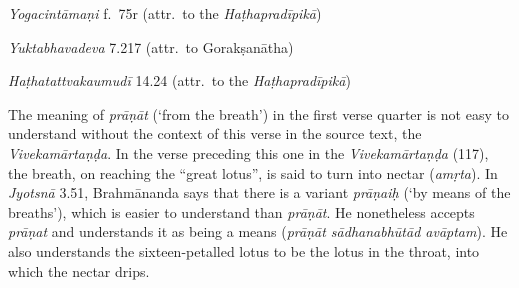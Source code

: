 \begin{ekdosis}
\begin{testimonia}[hp03_047]
\emph{Yogacintāmaṇi} f.~75r (attr.~to the \emph{Haṭhapradīpikā})
\begin{versinnote}
\end{versinnote}

\emph{Yuktabhavadeva} 7.217 (attr.~to Gorakṣanātha)
\begin{versinnote}
\tl{\var{cintayet ] cintayan \vl}\\!}
\end{versinnote}

\emph{Haṭhatattvakaumudī} 14.24 (attr.~to the \emph{Haṭhapradīpikā})
\begin{versinnote}
\tl{\var{ūrdhvaṃ ] mūrdhvaṃ \vl}\\!}
\end{versinnote}
\end{testimonia}

\begin{philcomm}[hp03_047]
The meaning of \emph{prāṇāt} (`from the breath') in the first verse quarter is not easy to understand without the context of this verse in the source text, the \emph{Vivekamārtaṇḍa}. In the verse preceding this one in the \emph{Vivekamārtaṇḍa} (117), the breath, on reaching the “great lotus”, is said to turn into nectar (\emph{amṛta}). In \emph{Jyotsnā} 3.51, Brahmānanda says that there is a variant \emph{prāṇaiḥ} (`by means of the breaths'), which is easier to understand than \emph{prāṇāt}. He nonetheless accepts \emph{prāṇat} and understands it as being a means (\emph{prāṇāt sādhanabhūtād avāptam}). He also understands the sixteen-petalled lotus to be the lotus in the throat, into which the nectar drips.
\end{philcomm}


\end{ekdosis}
